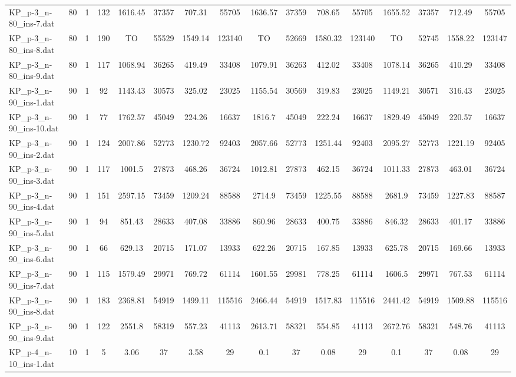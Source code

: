 \begin{sidewaystable}[!ht]
{\begin{tabular}{lccccccccccccccc}
KP\_p-3\_n-80\_ins-7.dat & 80 & 1 & 132 & 1616.45 & 37357 & 707.31 & 55705 & 1636.57 & 37359 & 708.65 & 55705 & 1655.52 & 37357 & 712.49 & 55705 \\
KP\_p-3\_n-80\_ins-8.dat & 80 & 1 & 190 &  TO & 55529 &  \textcolor{blue2}{1549.14} & 123140 &  TO & 52669 & 1580.32 & 123140 &  TO & 52745 & 1558.22 & 123147 \\
KP\_p-3\_n-80\_ins-9.dat & 80 & 1 & 117 & 1068.94 & 36265 & 419.49 & 33408 & 1079.91 & 36263 & 412.02 & 33408 & 1078.14 & 36265 &  \textcolor{blue2}{410.29} & 33408 \\
KP\_p-3\_n-90\_ins-1.dat & 90 & 1 & 92 & 1143.43 & 30573 & 325.02 & 23025 & 1155.54 & 30569 & 319.83 & 23025 & 1149.21 & 30571 &  \textcolor{blue2}{316.43} & 23025 \\
KP\_p-3\_n-90\_ins-10.dat & 90 & 1 & 77 & 1762.57 & 45049 & 224.26 & 16637 & 1816.7 & 45049 & 222.24 & 16637 & 1829.49 & 45049 & 220.57 & 16637 \\
KP\_p-3\_n-90\_ins-2.dat & 90 & 1 & 124 & 2007.86 & 52773 & 1230.72 & 92403 & 2057.66 & 52773 & 1251.44 & 92403 & 2095.27 & 52773 &  \textcolor{blue2}{1221.19} & 92405 \\
KP\_p-3\_n-90\_ins-3.dat & 90 & 1 & 117 & 1001.5 & 27873 & 468.26 & 36724 & 1012.81 & 27873 &  \textcolor{blue2}{462.15} & 36724 & 1011.33 & 27873 & 463.01 & 36724 \\
KP\_p-3\_n-90\_ins-4.dat & 90 & 1 & 151 & 2597.15 & 73459 &  \textcolor{blue2}{1209.24} & 88588 & 2714.9 & 73459 & 1225.55 & 88588 & 2681.9 & 73459 & 1227.83 & 88587 \\
KP\_p-3\_n-90\_ins-5.dat & 90 & 1 & 94 & 851.43 & 28633 & 407.08 & 33886 & 860.96 & 28633 & 400.75 & 33886 & 846.32 & 28633 & 401.17 & 33886 \\
KP\_p-3\_n-90\_ins-6.dat & 90 & 1 & 66 & 629.13 & 20715 & 171.07 & 13933 & 622.26 & 20715 & 167.85 & 13933 & 625.78 & 20715 & 169.66 & 13933 \\
KP\_p-3\_n-90\_ins-7.dat & 90 & 1 & 115 & 1579.49 & 29971 & 769.72 & 61114 & 1601.55 & 29981 & 778.25 & 61114 & 1606.5 & 29971 &  \textcolor{blue2}{767.53} & 61114 \\
KP\_p-3\_n-90\_ins-8.dat & 90 & 1 & 183 & 2368.81 & 54919 &  \textcolor{blue2}{1499.11} & 115516 & 2466.44 & 54919 & 1517.83 & 115516 & 2441.42 & 54919 & 1509.88 & 115516 \\
KP\_p-3\_n-90\_ins-9.dat & 90 & 1 & 122 & 2551.8 & 58319 & 557.23 & 41113 & 2613.71 & 58321 & 554.85 & 41113 & 2672.76 & 58321 & 548.76 & 41113 \\
KP\_p-4\_n-10\_ins-1.dat & 10 & 1 & 5 & 3.06 & 37 & 3.58 & 29 & 0.1 & 37 & 0.08 & 29 & 0.1 & 37 & 0.08 & 29 \\

\end{tabular}}
\end{sidewaystable}
